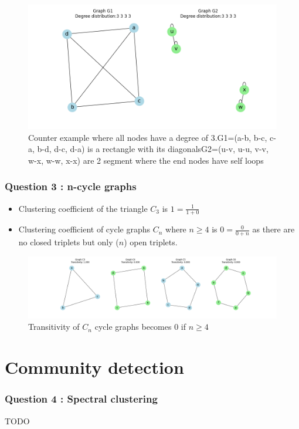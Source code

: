 \documentclass[a4paper]{article}
\begin{document}
\begin{figure}[ht]
    \centering
    \includegraphics[width=.6\textwidth]{figures/graph_compare_quad.png}
    \caption{Counter example where all nodes have a degree of 3.G1=(a-b, b-c, c-a, b-d, d-c, d-a) is a rectangle with its diagonalsG2=(u-v, u-u, v-v, w-x, w-w, x-x) are 2 segment where the end nodes have self loops}
    \label{fig:graph_compare_quad}
\end{figure}

\pagebreak
\section{Question 3 : n-cycle graphs}
\begin{itemize}
    \item Clustering coefficient of the triangle $C_3$ is $1=\frac{1}{1+0}$
    \item Clustering coefficient of cycle graphs $C_n$ where $n \geq 4$ is $0=\frac{0}{0+n}$
    as there are no closed triplets but only ($n$) open triplets. 
\end{itemize}
\begin{figure}[ht]
        \centering
        \includegraphics[width=.6\textwidth]{figures/cycle_graphs.png}
        \caption{Transitivity of $C_n$ cycle graphs becomes 0 if $n \geq 4$}
        \label{fig:cycle_graphs}
\end{figure}




\pagebreak
\part[short]{Community detection}
\section{Question 4 : Spectral clustering}
TODO 
\end{document}

